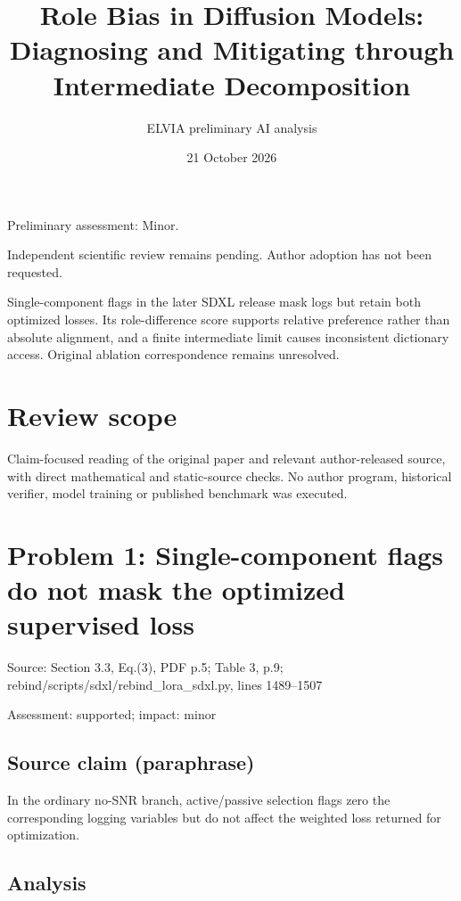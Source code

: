 \documentclass[11pt]{article}
\begin{document}
\title{Role Bias in Diffusion Models: Diagnosing and Mitigating through Intermediate Decomposition}

\author{ELVIA preliminary AI analysis}\date{21 October 2026}\maketitle

Preliminary assessment: Minor.\par

Independent scientific review remains pending. Author adoption has not been requested.

Single-component flags in the later SDXL release mask logs but retain both optimized losses. Its role-difference score supports relative preference rather than absolute alignment, and a finite intermediate limit causes inconsistent dictionary access. Original ablation correspondence remains unresolved.

\section*{Review scope}

Claim-focused reading of the original paper and relevant author-released source, with direct mathematical and static-source checks. No author program, historical verifier, model training or published benchmark was executed.

\section*{Problem 1: Single-component flags do not mask the optimized supervised loss}

Source: Section 3.3, Eq.(3), PDF p.5; Table 3, p.9; rebind/scripts/sdxl/rebind\_lora\_sdxl.py, lines 1489–1507

Assessment: supported; impact: minor

\subsection*{Source claim (paraphrase)}

In the ordinary no-SNR branch, active/passive selection flags zero the corresponding logging variables but do not affect the weighted loss returned for optimization.

\subsection*{Analysis}
\end{document}
